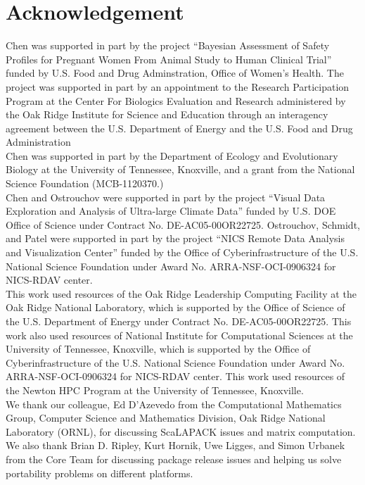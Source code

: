 
\section*{Acknowledgement}

Chen was supported in part by the project
``Bayesian Assessment of Safety Profiles for Pregnant Women From Animal
Study to Human Clinical Trial'' funded by U.S. Food and Drug Adminstration,
Office of Women's Health. The project was supported
in part by an appointment to the Research Participation Program at the
Center For Biologics Evaluation and Research administered by the Oak Ridge
Institute for Science and Education through an interagency agreement between
the U.S. Department of Energy and the U.S. Food and Drug Administration
\\

Chen was supported in part by
the Department of Ecology and Evolutionary Biology at the
University of Tennessee, Knoxville, and a grant from
the National Science Foundation (MCB-1120370.)
\\

Chen and Ostrouchov were supported in part by the project
``Visual Data Exploration and Analysis of Ultra-large Climate Data''
funded by U.S. DOE Office of Science
under Contract No. DE-AC05-00OR22725.
Ostrouchov, Schmidt, and Patel were supported in part by the project
``NICS Remote Data Analysis and Visualization Center''
funded by the Office of Cyberinfrastructure of the
U.S. National Science Foundation
under Award No. ARRA-NSF-OCI-0906324 for NICS-RDAV center.
\\

This work used resources of the Oak Ridge Leadership Computing Facility at the
Oak Ridge National Laboratory, which is supported by the Office of Science
of the U.S. Department of Energy under Contract No. DE-AC05-00OR22725.
This work also used resources of National Institute for Computational
Sciences at the University of Tennessee, Knoxville, which is supported
by the Office of Cyberinfrastructure of the U.S. National Science Foundation
under Award No. ARRA-NSF-OCI-0906324 for NICS-RDAV center.
This work used resources of the Newton HPC Program at the University of
Tennessee, Knoxville.
\\

We thank our colleague, Ed D'Azevedo
from the Computational Mathematics Group,
Computer Science and Mathematics Division,
Oak Ridge National Laboratory (ORNL),
for discussing ScaLAPACK issues and matrix computation.
\\

We also thank Brian D. Ripley, Kurt Hornik, Uwe Ligges, and Simon Urbanek
from the  Core Team for discussing package release issues and
helping us solve portability problems on different platforms.
\\
